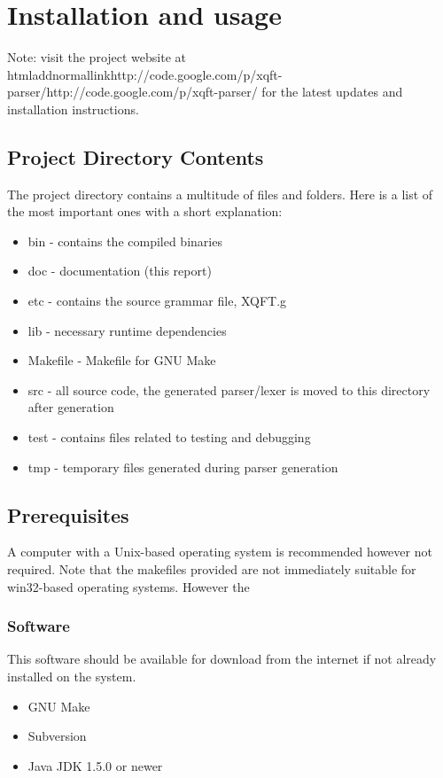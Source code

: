 \chapter{Installation and usage}
\label{appendix:installation}
Note: visit the project website at
htmladdnormallink{http://code.google.com/p/xqft-parser/}{http://code.google.com/p/xqft-parser/}
for the latest updates and installation instructions.

\section*{Project Directory Contents}
The project directory contains a multitude of files and folders. Here is a list
of the most important ones with a short explanation:
\begin{itemize}
  \item bin - contains the compiled binaries
  \item doc - documentation (this report)
  \item etc - contains the source grammar file, XQFT.g
  \item lib - necessary runtime dependencies
  \item Makefile - Makefile for GNU Make
  \item src - all source code, the generated parser/lexer is moved to this
  directory after generation
  \item test - contains files related to testing and debugging
  \item tmp - temporary files generated during parser generation
\end{itemize}

\section*{Prerequisites}
A computer with a Unix-based operating system is recommended however not
required. Note that the makefiles provided are not immediately suitable for
win32-based operating systems. However the 

\subsection*{Software}
This software should be available for download from the internet if not already
installed on the system.

\begin{itemize}
  \item GNU Make
  \item Subversion
  \item Java JDK 1.5.0 or newer
\end{itemize}


